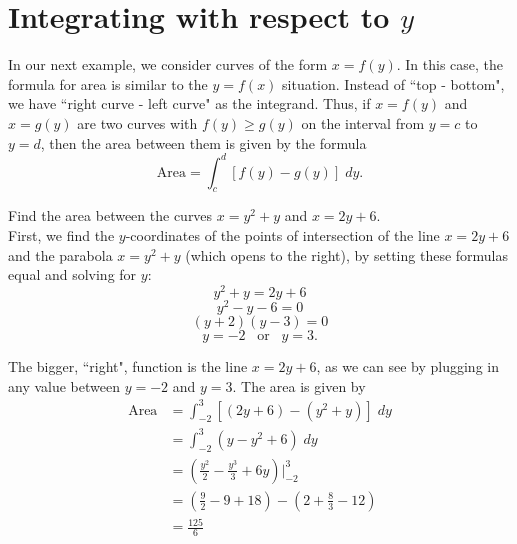 \documentclass{ximera}
\begin{document}
\section{Integrating with respect to $y$}
In our next example, we consider curves of the form $x = f(y)$. In this case, 
the formula for area is similar to the $y = f(x)$ situation. Instead of ``top - bottom", we have ``right curve - left curve" as the integrand.
Thus, if $x = f(y)$ and $x = g(y)$ are two curves with $f(y) \geq g(y)$ on the interval from $y = c$ to $y = d$, 
then the area between them is given by the formula
\[
\text{Area} = \int_c^d [f(y) - g(y)] \; dy.
\]
\begin{example}[example 9]
Find the area between the curves $x = y^2 + y$ and $x = 2y + 6$.\\
First, we find the $y$-coordinates of the points of intersection of the line $x = 2y+6$ 
and the parabola $x=y^2 + y$ (which opens to the right), by setting these formulas equal and solving for $y$:
\[
y^2 + y = 2y + 6
\]
\[
y^2 - y -  6 = 0
\]
\[
(y+2)(y-3) = 0
\]
\[
y = -2 \;\;\; \text{or}  \;\;\; y = 3.
\]

The bigger, ``right", function is the line $x = 2y+6$, as we can see by plugging in any value between $y = -2$ and $y=3$.
The area is given by
\begin{align*}
\text{Area} &= \int_{-2}^3 \left[(2y+6) - (y^2+y) \right] \; dy \\
            &= \int_{-2}^3 \left(y - y^2 + 6\right) \; dy \\
            &= \left(\frac{y^2}{2} - \frac{y^3}{3} + 6y \right) \bigg|_{-2}^{3} \\
            &= \left(\tfrac92 - 9 + 18\right) - \left(2 + \tfrac83 - 12\right)\\
            &= \tfrac{125}{6}         
\end{align*}


\begin{center}
\end{center}
\end{example}
\end{document}
